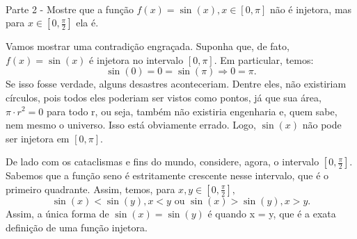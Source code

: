 \documentclass[exercícios_de_cálculo.tex]{subfiles}
\begin{document}
\paragraph{}Parte 2 - Mostre que a função $f(x) = \sin(x), x\in[0, \pi]$ não é injetora, mas para $x\in[0, \frac{\pi}{2}]$ ela é.
\begin{proof*}
	Vamos mostrar uma contradição engraçada. Suponha que, de fato, $f(x) = \sin(x)$ é injetora no intervalo $[0, \pi]$. Em particular, temos:
	$$
		\sin(0) = 0 = \sin(\pi) \Rightarrow 0 = \pi.
	$$
	Se isso fosse verdade, alguns desastres aconteceriam. Dentre eles, não existiriam círculos, pois todos eles poderiam ser vistos como pontos, já que sua área, $\pi\cdot{r^2} = 0$ para todo r, ou seja, também não existiria engenharia e, quem sabe, nem mesmo o universo. Isso está obviamente errado. Logo, $\sin(x)$ n\~ao pode ser injetora em $[0, \pi].$

	De lado com os cataclismas e fins do mundo, considere, agora, o intervalo $[0, \frac{\pi}{2}].$ Sabemos que a função seno é estritamente crescente nesse intervalo, que é o primeiro quadrante. Assim, temos, para $x, y\in[0, \frac{\pi}{2}],$
	$$
		\sin(x) < \sin(y), x < y \text{ ou } \sin(x) > \sin(y), x > y.
	$$
	Assim, a única forma de $\sin(x) = \sin(y)$ é quando x = y, que é a exata definição de uma função injetora.
	\qedsymbol
\end{proof*}
\end{document}
